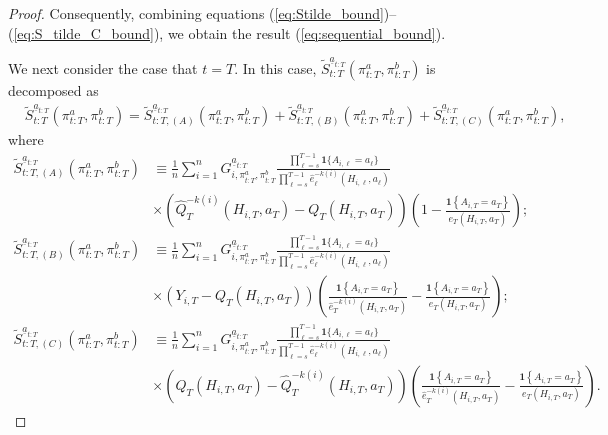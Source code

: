 \begin{proof}
Consequently, combining equations (\ref{eq:Stilde_bound})--(\ref{eq:S_tilde_C_bound}), we obtain the result (\ref{eq:sequential_bound}).


We next consider the case that $t=T$. In this case, $\widetilde{S}_{t:T}^{\underline{a}_{t:T}}(\pi_{t:T}^{a},\pi_{t:T}^{b})$ is decomposed as
\begin{align*}
    &\widetilde{S}_{t:T}^{\underline{a}_{t:T}}(\pi_{t:T}^{a},\pi_{t:T}^{b}) = \widetilde{S}_{t:T,(A)}^{\underline{a}_{t:T}}(\pi_{t:T}^{a},\pi_{t:T}^{b}) 
    + \widetilde{S}_{t:T,(B)}^{\underline{a}_{t:T}}(\pi_{t:T}^{a},\pi_{t:T}^{b})  
    + \widetilde{S}_{t:T,(C)}^{\underline{a}_{t:T}}(\pi_{t:T}^{a},\pi_{t:T}^{b}),
\end{align*}
where 
\begin{align*}
\widetilde{S}_{t:T,(A)}^{\underline{a}_{t:T}}(\pi_{t:T}^{a},\pi_{t:T}^{b})& \equiv \frac{1}{n}\sum_{i=1}^{n}
G_{i,\pi_{t:T}^{a},\pi_{t:T}^{b}}^{\underline{a}_{t:T}}
\frac{\prod_{\ell=s}^{T-1}\mathbf{1}\{A_{i,\ell}=a_{\ell}\}}{\prod_{\ell=s}^{T-1}\hat{e}_{\ell}^{-k(i)}(H_{i,\ell},a_{\ell})} \nonumber \\
&\times\left(\widehat{Q}_{T}^{-k(i)}\left(H_{i,T},a_{T}\right)-Q_{T}\left(H_{i,T},a_{T}\right)\right) \left(1-\frac{\mathbf{1}\left\{ A_{i,T}=a_{T}\right\} }{e_{T}\left(H_{i,T},a_{T}\right)}\right); \ \\
\widetilde{S}_{t:T,(B)}^{\underline{a}_{t:T}}(\pi_{t:T}^{a},\pi_{t:T}^{b})& \equiv \frac{1}{n}\sum_{i=1}^{n}G_{i,\pi_{t:T}^{a},\pi_{t:T}^{b}}^{\underline{a}_{t:T}}\frac{\prod_{\ell=s}^{T-1}\mathbf{1}\{A_{i,\ell}=a_{\ell}\}}{\prod_{\ell=s}^{T-1}\hat{e}_{\ell}^{-k(i)}(H_{i,\ell},a_{\ell})} \nonumber \\
	&\times\left(Y_{i,T}-Q_{T}\left(H_{i,T},a_{T}\right)\right)  \left(\frac{\mathbf{1}\left\{ A_{i,T}=a_{T}\right\} }{\hat{e}_{T}^{-k(i)}\left(H_{i,T},a_{T}\right)}-\frac{\mathbf{1}\left\{ A_{i,T}=a_{T}\right\} }{e_{T}\left(H_{i,T},a_{T}\right)}\right);  \\
\widetilde{S}_{t:T,(C)}^{\underline{a}_{t:T}}(\pi_{t:T}^{a},\pi_{t:T}^{b})& \equiv \frac{1}{n}\sum_{i=1}^{n}G_{i,\pi_{t:T}^{a},\pi_{t:T}^{b}}^{\underline{a}_{t:T}}\frac{\prod_{\ell=s}^{T-1}\mathbf{1}\{A_{i,\ell}=a_{\ell}\}}{\prod_{\ell=s}^{T-1}\hat{e}_{\ell}^{-k(i)}(H_{i,\ell},a_{\ell})} \nonumber \\
&\times\left(Q_{T}\left(H_{i,T},a_{T}\right)-\widehat{Q}_{T}^{-k(i)}\left(H_{i,T},a_{T}\right)\right) 
\left(\frac{\mathbf{1}\left\{ A_{i,T}=a_{T}\right\} }{\hat{e}_{T}^{-k(i)}\left(H_{i,T},a_{T}\right)}-\frac{\mathbf{1}\left\{ A_{i,T}=a_{T}\right\} }{e_{T}\left(H_{i,T},a_{T}\right)}\right).

\end{align*}
\end{proof}
